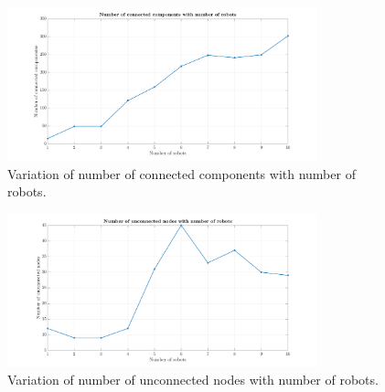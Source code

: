 \documentclass[12pt,a4paper, onecolumn]{IEEEtran}
\begin{document}
\begin{figure}[htbp]
  \centering
  \includegraphics[width=0.8\textwidth, trim={4cm 0 4cm 0},clip]{cc_plot.png}
  \caption{Variation of number of connected components with number of robots. }
  \label{fig:cc}
\end{figure}

\begin{figure}[htbp]
  \centering
  \includegraphics[width=0.8\textwidth, trim={4cm 0 4cm 0},clip]{ccn_plot.png}
  \caption{Variation of number of unconnected nodes with number of robots. }
  \label{fig:ccn}
\end{figure}



\end{document}
